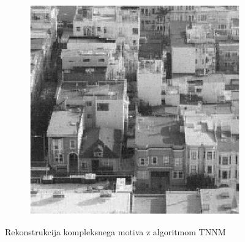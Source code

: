 \begin{figure}
\begin{subfigure}{0.325\linewidth}
    \end{subfigure}
    \hfill
    \begin{subfigure}{0.325\linewidth}
        \includegraphics[width=\linewidth]{Poglavja/Slike/kompleksna grayscale 300/rez60TNNM.png}
    \end{subfigure}
    \caption{Rekonstrukcija kompleksnega motiva z algoritmom TNNM}
\end{figure}

